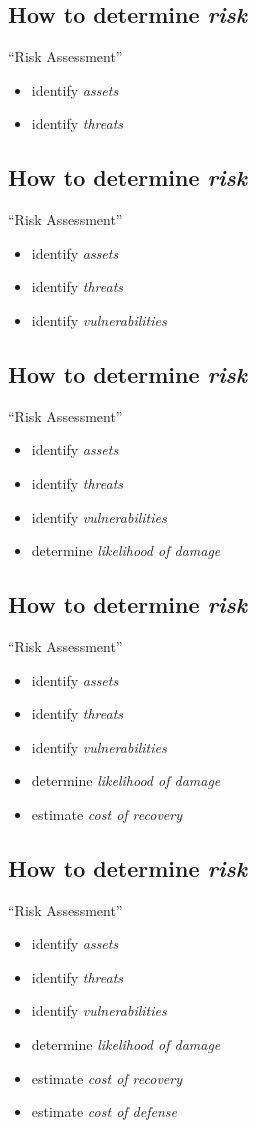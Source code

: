 \documentclass[xga]{xdvislides}
\begin{document}
\subsection{How to determine {\em risk}}
``Risk Assessment''
\begin{itemize}
	\item identify {\em assets}
	\item identify {\em threats}
\end{itemize}


\subsection{How to determine {\em risk}}
``Risk Assessment''
\begin{itemize}
	\item identify {\em assets}
	\item identify {\em threats}
	\item identify {\em vulnerabilities}
\end{itemize}

\subsection{How to determine {\em risk}}
``Risk Assessment''
\begin{itemize}
	\item identify {\em assets}
	\item identify {\em threats}
	\item identify {\em vulnerabilities}
	\item determine {\em likelihood of damage}
\end{itemize}

\subsection{How to determine {\em risk}}
``Risk Assessment''
\begin{itemize}
	\item identify {\em assets}
	\item identify {\em threats}
	\item identify {\em vulnerabilities}
	\item determine {\em likelihood of damage}
	\item estimate {\em cost of recovery}
\end{itemize}

\subsection{How to determine {\em risk}}
``Risk Assessment''
\begin{itemize}
	\item identify {\em assets}
	\item identify {\em threats}
	\item identify {\em vulnerabilities}
	\item determine {\em likelihood of damage}
	\item estimate {\em cost of recovery}
	\item estimate {\em cost of defense}
\end{itemize}
\end{document}
